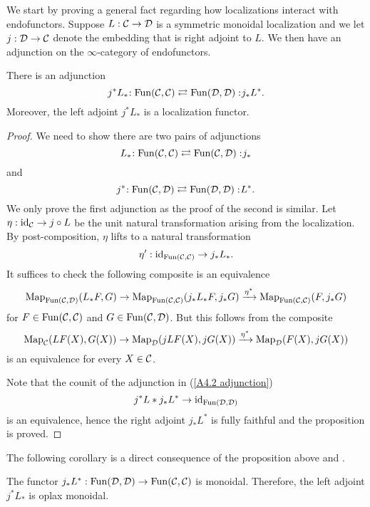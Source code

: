 We start by proving a general fact regarding how localizations interact with endofunctors.
Suppose $L:{\mathcal{C}} \to {\mathcal{D}}$ is a symmetric monoidal localization
and we let $j:{\mathcal{D}} \to {\mathcal{C}}$ denote the embedding that is right adjoint to $L$.
We then have an adjunction on the $\infty$-category of endofunctors.
\begin{proposition}
\label{Prop A.4.2}
There is an adjunction
\begin{equation}
\label{A4.2 adjunction}
    j^*L_*\negmedspace: \operatorname{Fun}({\mathcal{C}}, {\mathcal{C}})\rightleftarrows \operatorname{Fun}({\mathcal{D}}, {\mathcal{D}}):\negmedspace j_* L^*.
\end{equation}
    Moreover, the left adjoint $j^*L_*$ is a localization functor.
\end{proposition}
\begin{proof}
    We need to show there are two pairs of adjunctions
    $$
    L_{*}\negmedspace: \operatorname{Fun}({\mathcal{C}}, {\mathcal{C}})\rightleftarrows \operatorname{Fun}({\mathcal{C}}, {\mathcal{D}}):\negmedspace j_*
    $$
    and
    $$
    j^{*}\negmedspace: \operatorname{Fun}({\mathcal{C}}, {\mathcal{D}})\rightleftarrows \operatorname{Fun}({\mathcal{D}}, {\mathcal{D}}):\negmedspace L^*.
    $$
    We only prove the first adjunction as the proof of the second is similar.
    Let $\eta: \operatorname{id}_{{\mathcal{C}}} \to j\circ L$ be the unit natural transformation arising from the localization.
    By post-composition, $\eta$ lifts to a natural transformation
    $$
    \eta': \operatorname{id}_{\operatorname{Fun}({\mathcal{C}},{\mathcal{C}})} \to j_*L_*. 
    $$
    It suffices to check the following composite is an equivalence 
    $$
    \operatorname{Map}_{\operatorname{Fun}({\mathcal{C}},{\mathcal{D}})}(L_{*}F, G) \to 
    \operatorname{Map}_{\operatorname{Fun}({\mathcal{C}},{\mathcal{C}})}(j_*L_{*}F,  j_*G)
    \xrightarrow{\eta^*}
    \operatorname{Map}_{\operatorname{Fun}({\mathcal{C}},{\mathcal{C}})}(F, j_{*}G)
    $$
    for $F\in \operatorname{Fun}({\mathcal{C}},{\mathcal{C}})$ and $G\in \operatorname{Fun}({\mathcal{C}}, {\mathcal{D}})$.
    But this follows from the composite
    $$
    \operatorname{Map}_{{\mathcal{C}}}(LF(X), G(X)) \to 
    \operatorname{Map}_{{\mathcal{D}}}(jLF(X),  jG(X))
    \xrightarrow{\eta^*}
    \operatorname{Map}_{{\mathcal{D}}}(F(X), jG(X))
    $$
    is an equivalence for every $X\in {\mathcal{C}}$.
    
    Note that the counit of the adjunction in (\ref{A4.2 adjunction})
    $$
    j^*L* j_* L^* \to \operatorname{id}_{\operatorname{Fun}({\mathcal{D}}, {\mathcal{D}})}
    $$
    is an equivalence, hence the right adjoint $j_*L^*$ is fully faithful and the proposition is proved.
\end{proof}

The following corollary is a direct consequence of the proposition above and \cite[Proposition 2.2.1.1.]{HA}.
\begin{corollary}
\label{j_*L^* is monoidal}
The functor $j_*L^*: \operatorname{Fun}({\mathcal{D}},{\mathcal{D}}) \to \operatorname{Fun}({\mathcal{C}},{\mathcal{C}})$ is monoidal.
Therefore, the left adjoint $j^*L_*$ is oplax monoidal.
\end{corollary}

